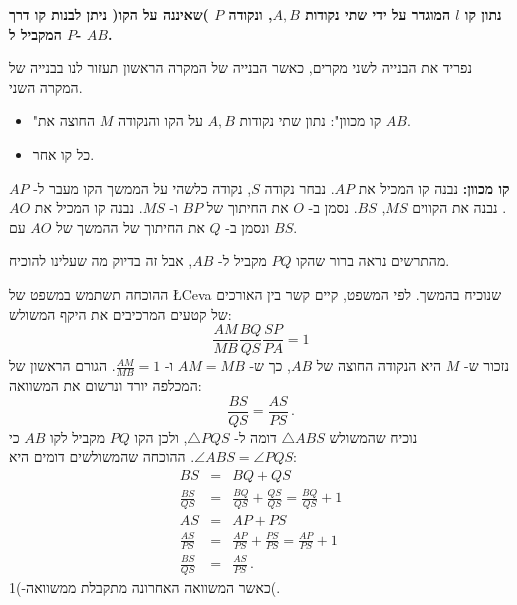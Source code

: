 \documentclass[12pt,a4paper]{article}
\newcommand*{\disfrac}[2]{\displaystyle\frac{#1}{#2}}
\begin{document}
\textbf{%
נתון קו
$l$
המוגדר על ידי שתי נקודות
$A,B$,
ונקודה 
$P$
)שאיננה על הקו( ניתן לבנות קו דרך
$P$
המקביל ל-
$AB$.%
}

נפריד את הבנייה לשני מקרים, כאשר הבנייה של המקרה הראשון תעזור לנו בבנייה של המקרה השני.
\begin{itemize}
\item
"קו מכוון": נתון שתי נקודות
$A,B$
על הקו והנקודה 
$M$
החוצה את
$AB$.
\item
כל קו אחר.
\end{itemize}

\textbf{%
קו מכוון:
}
נבנה קו המכיל את
$AP$.
נבחר נקודה
$S$,
נקודה כלשהי על הממשך הקו מעבר ל-%
$AP$.
נבנה את הקווים
$MS$, $BS$.
נסמן ב-%
$O$
את החיתוך של 
$BP$
ו-%
$MS$.
נבנה קו המכיל את
$AO$
ונסמן ב-%
$Q$
את החיתוך של ההמשך של
$AO$
עם
$BS$.
\begin{center}
\vspace*{-8pt}
\vspace*{-6pt}
\end{center}
מהתרשים נראה ברור שהקו 
$PQ$
מקביל ל-%
$AB$,
אבל זה בדיוק מה שעלינו להוכיח.

ההוכחה תשתמש במשפט של
\L{Ceva}
שנוכיח בהמשך. לפי המשפט, קיים קשר בין האורכים של קטעים המרכיבים את היקף המשולש:
\[
\frac{AM}{MB}\frac{BQ}{QS}\frac{SP}{PA} = 1
\]
נזכור ש-%
$M$
היא הנקודה החוצה של
$AB$,
כך ש-%
$AM=MB$
ו-%
$\frac{AM}{MB}=1$.
הגורם הראשון של המכלפה יורד ונרשום את המשוואה:
\begin{equation}
\frac{BS}{QS}=\frac{AS}{PS}\,.
\end{equation}
נוכיח שהמשולש
$\triangle ABS$
דומה ל-%
$\triangle PQS$,
ולכן הקו
$PQ$
מקביל לקו
$AB$
כי
$\angle ABS = \angle PQS$.
ההוכחה שהמשולשים דומים היא:
\[
\renewcommand*{\arraystretch}{2}
\begin{array}{rcl}
BS&=&BQ+QS\\
\disfrac{BS}{QS}&=&\disfrac{BQ}{QS}+\disfrac{QS}{QS} = \disfrac{BQ}{QS}+1\\
AS&=&AP+PS\\
\disfrac{AS}{PS} &=& \disfrac{AP}{PS} + \disfrac{PS}{PS} = \disfrac{AP}{PS} + 1\\
\disfrac{BS}{QS}&=&\disfrac{AS}{PS}\,.
\end{array}
\]
כאשר המשוואה האחרונה מתקבלת ממשוואה-)1(.
\end{document}

